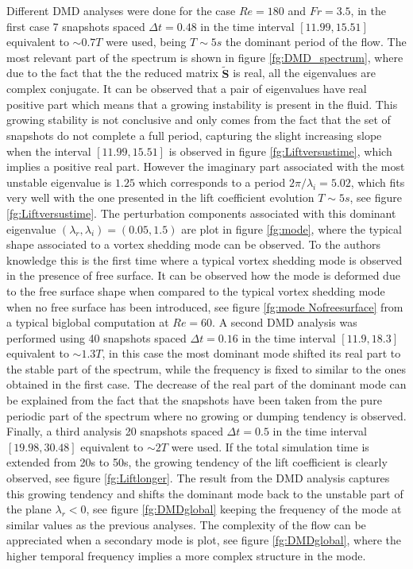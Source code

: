 Different DMD analyses were done for the case $Re=180$ and $Fr=3.5$, in the first case 7 snapshots spaced $\Delta t=0.48$ in the time interval $[11.99,15.51]$ equivalent to $\sim0.7T$ were used, being $T\sim5s$ the dominant period of the flow. The most relevant part of the spectrum is shown in figure \ref{fg:DMD_spectrum}, where due to the fact that the the reduced matrix $\mathbf{\widetilde{S}}$ is real, all the eigenvalues are complex conjugate. It can be observed that a pair of eigenvalues have real positive part which means that a growing instability is present in the fluid. This growing stability is not conclusive and only comes from the fact that the set of snapshots do not complete a full period, capturing the slight increasing slope when the interval $[11.99,15.51]$ is observed in figure \ref{fg:Liftversustime}, which implies a positive real part. However the imaginary part associated with the most unstable eigenvalue is $1.25$ which corresponds to a period $2\pi/\lambda_i=5.02$, which fits very well with the one presented in the lift coefficient evolution $T\sim5s$, see figure \ref{fg:Liftversustime}. The perturbation components associated with this dominant eigenvalue $(\lambda_r,\lambda_i)=(0.05,1.5)$ are plot in figure \ref{fg:mode}, where the typical shape associated to a vortex shedding mode can be observed. To the authors knowledge this is the first time where a typical vortex shedding mode is observed in the presence of free surface. It can be observed how the mode is deformed due to the free surface shape when compared to the typical vortex shedding mode when no free surface has been introduced, see figure \ref{fg:mode Nofreesurface} from a typical biglobal computation at $Re=60$. A second DMD analysis was performed using 40 snapshots spaced $\Delta t=0.16$ in the time interval $[11.9,18.3]$ equivalent to $\sim 1.3T$, in this case the most dominant mode shifted its real part to the stable part of the spectrum, while the frequency is fixed to similar to the ones obtained in the first case. The decrease of the real part of the dominant mode can be explained from the fact that the snapshots have been taken from the pure periodic part of the spectrum where no growing or dumping tendency is observed. Finally, a third analysis 20 snapshots spaced $\Delta t=0.5$ in the time interval $[19.98,30.48]$ equivalent to $\sim2T$ were used. If the total simulation time is extended from 20s to 50s, the growing tendency of the lift coefficient is clearly observed, see figure \ref{fg:Liftlonger}. The result from the DMD analysis captures this growing tendency and shifts the dominant mode back to the unstable part of the plane $\lambda_r<0$, see figure \ref{fg:DMDglobal} keeping the frequency of the mode at similar values as the previous analyses. The complexity of the flow can be appreciated when a secondary mode is plot, see figure \ref{fg:DMDglobal}, where the higher temporal frequency implies a more complex structure in the mode.

